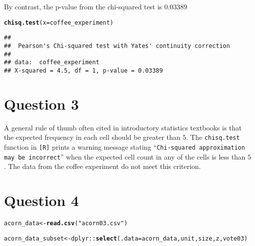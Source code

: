 \documentclass[11pt]{article}\usepackage[]{graphicx}\usepackage[]{color}
\makeatletter
\newcommand{\hlstr}[1]{\textcolor[rgb]{0.192,0.494,0.8}{#1}}%
\newcommand{\hlopt}[1]{\textcolor[rgb]{0,0,0}{#1}}%
\newcommand{\hlstd}[1]{\textcolor[rgb]{0.345,0.345,0.345}{#1}}%
\newcommand{\hlkwb}[1]{\textcolor[rgb]{0.69,0.353,0.396}{#1}}%
\newcommand{\hlkwc}[1]{\textcolor[rgb]{0.333,0.667,0.333}{#1}}%
\newcommand{\hlkwd}[1]{\textcolor[rgb]{0.737,0.353,0.396}{\textbf{#1}}}%
\newenvironment{kframe}{%
 \def\at@end@of@kframe{}%
 \ifinner\ifhmode%
  \def\at@end@of@kframe{\end{minipage}}%
  \begin{minipage}{\columnwidth}%
 \fi\fi%
 \def\FrameCommand##1{\hskip\@totalleftmargin \hskip-\fboxsep
 \colorbox{shadecolor}{##1}\hskip-\fboxsep
     \hskip-\linewidth \hskip-\@totalleftmargin \hskip\columnwidth}%
 \MakeFramed {\advance\hsize-\width
   \@totalleftmargin\z@ \linewidth\hsize
   \@setminipage}}%
 {\par\unskip\endMakeFramed%
 \at@end@of@kframe}
\newenvironment{knitrout}{}{} %
\theoremstyle{newstyle}
\makeatother
\begin{document}
By contrast, the p-value from the chi-squared test is $0.03389$

\begin{knitrout}
\color{fgcolor}\begin{kframe}
\begin{alltt}
\hlkwd{chisq.test}\hlstd{(}\hlkwc{x} \hlstd{= coffee_experiment)}
\end{alltt}


{\ttfamily\noindent\color{warningcolor}{\#\# Warning in chisq.test(x = coffee\_experiment): Chi-squared approximation may be incorrect}}\begin{verbatim}
## 
## 	Pearson's Chi-squared test with Yates' continuity correction
## 
## data:  coffee_experiment
## X-squared = 4.5, df = 1, p-value = 0.03389
\end{verbatim}
\end{kframe}
\end{knitrout}

\section{Question 3}

A general rule of thumb often cited in introductory statistics textbooks is that the expected frequency in each cell should be greater than $5$. The \texttt{chisq.test} function in \texttt{[R]} prints a warning message stating ``\texttt{Chi-squared approximation may be incorrect}'' when the expected cell count in any of the cells is less than $5$. The data from the coffee experiment do not meet this criterion.

\section{Question 4}

\begin{knitrout}
\color{fgcolor}\begin{kframe}
\begin{alltt}
\hlstd{acorn_data} \hlkwb{<-} \hlkwd{read.csv}\hlstd{(}\hlstr{"acorn03.csv"}\hlstd{)}
\end{alltt}


{\ttfamily\noindent{}}

{\ttfamily\noindent\bfseries{}}\begin{alltt}
\hlstd{acorn_data_subset} \hlkwb{<-} \hlstd{dplyr}\hlopt{::}\hlkwd{select}\hlstd{(}\hlkwc{.data} \hlstd{= acorn_data, unit, size, z, vote03)}
\end{alltt}


{\ttfamily\noindent\bfseries\color{errorcolor}{\#\# Error in dplyr::select(.data = acorn\_data, unit, size, z, vote03): object 'acorn\_data' not found}}\end{kframe}
\end{knitrout}
\end{document}
